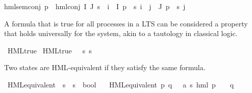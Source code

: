 \begin{isabellebody}
hml{\isacharunderscore}{\kern0pt}sem{\isacharunderscore}{\kern0pt}conj{\isacharcolon}{\kern0pt}\ {\isacartoucheopen}{\isacharparenleft}{\kern0pt}p\ {\isasymTurnstile}\ {\isacharparenleft}{\kern0pt}hml{\isacharunderscore}{\kern0pt}conj\ I\ J\ {\isasympsi}s{\isacharparenright}{\kern0pt}{\isacharparenright}{\kern0pt}\ {\isacharequal}{\kern0pt}\ {\isacharparenleft}{\kern0pt}{\isacharparenleft}{\kern0pt}{\isasymforall}i\ {\isasymin}\ I{\isachardot}{\kern0pt}\ p\ {\isasymTurnstile}\ {\isacharparenleft}{\kern0pt}{\isasympsi}s\ i{\isacharparenright}{\kern0pt}{\isacharparenright}{\kern0pt}\ {\isasymand}\ {\isacharparenleft}{\kern0pt}{\isasymforall}j\ {\isasymin}\ J{\isachardot}{\kern0pt}\ {\isasymnot}{\isacharparenleft}{\kern0pt}p\ {\isasymTurnstile}\ {\isacharparenleft}{\kern0pt}{\isasympsi}s\ j{\isacharparenright}{\kern0pt}{\isacharparenright}{\kern0pt}{\isacharparenright}{\kern0pt}{\isacharparenright}{\kern0pt}{\isacartoucheclose}%
\begin{isamarkuptext}%
A formula that is true for all processes in a LTS can be considered a property that holds universally for the system, akin to a tautology in classical logic.%
\end{isamarkuptext}\isamarkuptrue%
\isamarkupfalse%
\ HML{\isacharunderscore}{\kern0pt}true\ \isanewline
{\isachardoublequoteopen}HML{\isacharunderscore}{\kern0pt}true\ {\isasymphi}\ {\isasymequiv}\ {\isasymforall}s{\isachardot}{\kern0pt}\ s\ {\isasymTurnstile}\ {\isasymphi}{\isachardoublequoteclose}\isanewline
%
\isadelimproof
%
\endisadelimproof
%
\isatagproof
%
\endisatagproof
{\isafoldproof}%
%
\isadelimproof
%
\endisadelimproof
%
\begin{isamarkuptext}%
Two states are HML-equivalent if they satisfy the same formula.%
\end{isamarkuptext}\isamarkuptrue%
\isamarkupfalse%
\ HML{\isacharunderscore}{\kern0pt}equivalent\ {\isacharcolon}{\kern0pt}{\isacharcolon}{\kern0pt}\ {\isacartoucheopen}{\isacharprime}{\kern0pt}s\ {\isasymRightarrow}\ {\isacharprime}{\kern0pt}s\ {\isasymRightarrow}\ bool{\isacartoucheclose}\ \isanewline
\ \ {\isacartoucheopen}HML{\isacharunderscore}{\kern0pt}equivalent\ p\ q\ {\isasymequiv}\ {\isacharparenleft}{\kern0pt}{\isasymforall}\ {\isasymphi}{\isacharcolon}{\kern0pt}{\isacharcolon}{\kern0pt}{\isacharparenleft}{\kern0pt}{\isacharprime}{\kern0pt}a{\isacharcomma}{\kern0pt}\ {\isacharprime}{\kern0pt}s{\isacharparenright}{\kern0pt}\ hml{\isachardot}{\kern0pt}\ {\isacharparenleft}{\kern0pt}p\ {\isasymTurnstile}\ {\isasymphi}{\isacharparenright}{\kern0pt}\ {\isasymlongleftrightarrow}\ {\isacharparenleft}{\kern0pt}q\ {\isasymTurnstile}\ {\isasymphi}{\isacharparenright}{\kern0pt}{\isacharparenright}{\kern0pt}{\isacartoucheclose}\isanewline

\end{isabellebody}
